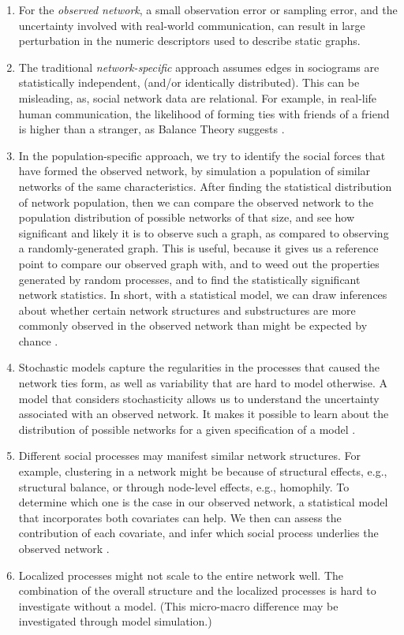 \documentclass[12pt,letterpaper]{gthesis2}  %
\begin{document}
\begin{enumerate}

\item For the \textit{observed network}, a small observation error or sampling error, and the uncertainty involved with real-world communication, can result in large perturbation in the numeric descriptors used to describe static graphs. 

\item The traditional \textit{network-specific} approach assumes edges in sociograms are statistically independent, (and/or identically distributed). This can be misleading, as, social network data are relational. For example, in real-life human communication, the likelihood of forming ties with friends of a friend is higher than a stranger, as Balance Theory suggests \cite{Heider}. 

\item In the population-specific approach, we try to identify the social forces that have formed the observed network, by simulation a population of similar networks of the same characteristics. After finding the statistical distribution of network population, then we can compare the observed network to the population distribution of possible networks of that size, and see how significant and likely it is to observe such a graph, as compared to observing a randomly-generated graph. This is useful, because it gives us a reference point to compare our observed graph with, and to weed out the properties generated by random processes, and to find the statistically significant network statistics. In short, with a statistical model, we can draw inferences about whether certain network structures and substructures are more commonly observed in the observed network than might be expected by chance \cite{Robins}. 

\item Stochastic models capture the regularities in the processes that caused the network ties form, as well as variability that are hard to model otherwise. A model that considers stochasticity allows us to understand the uncertainty associated with an observed network. It makes it possible to learn about the distribution of possible networks for a given specification of a model \cite{Robins}.

\item Different social processes may manifest similar network structures. For example, clustering in a network might be because of structural effects, e.g., structural balance, or through node-level effects, e.g., homophily. To determine which one is the case in our observed network, a statistical model that incorporates both covariates can help. We then can assess the contribution of each covariate, and infer which social process underlies the observed network \cite{Robins}. 

\item  Localized processes might not scale to the entire network well. The combination of the overall structure and the localized processes is hard to investigate without a model. (This micro-macro difference may be investigated through model simulation.)\cite{Robins}

\end{enumerate}
\end{document}
